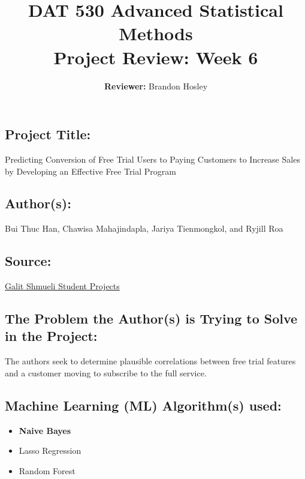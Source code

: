 \documentclass[]{article}
\title{\textbf{DAT 530 Advanced Statistical Methods}\\
	\normalsize{Project Review: Week 6} }
\author{\textbf{Reviewer: }
	Brandon Hosley}
\begin{document}
\setlength{\droptitle}{-10em} 
\pretitle{\begin{flushleft}\LARGE} %
	\posttitle{\end{flushleft}}
\preauthor{\begin{flushleft}\large} %
	\postauthor{\end{flushleft}}
\predate{\begin{flushleft}\large} %
	\postdate{\end{flushleft}}
\maketitle

\vspace{-2em}

\subsection*{Project Title:}
Predicting Conversion of Free Trial Users to Paying Customers
to Increase Sales by Developing an Effective Free Trial Program

\subsection*{Author(s):}
Bui Thuc Han,
Chawisa Mahajindapla,
Jariya Tienmongkol,
and Ryjill Roa

\subsection*{Source:}
\href{https://www.galitshmueli.com/data-mining-project/predicting-conversion-free-trial-users-paying-customers-increase-sales}{Galit Shmueli Student Projects}

\subsection*{The Problem the Author(s) is Trying to Solve in the Project:}
The authors seek to determine plausible correlations between free trial features and a customer moving to subscribe to the full service.

\subsection*{Machine Learning (ML) Algorithm(s) used:}
\begin{itemize}
	\item \textbf{Naive Bayes}
	\item Lasso Regression
	\item Random Forest
\end{itemize}
\end{document}

